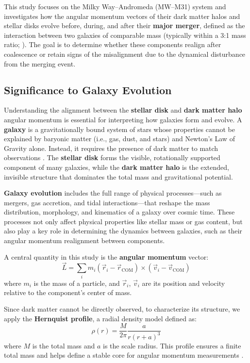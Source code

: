 \documentclass[twocolumn]{aastex631}
\begin{document}
This study focuses on the Milky Way–Andromeda (MW–M31) system and investigates how the angular momentum vectors of their dark matter halos and stellar disks evolve before, during, and after their \textbf{major merger}, defined as the interaction between two galaxies of comparable mass (typically within a 3:1 mass ratio; \citealt{Lotz2011}). The goal is to determine whether these components realign after coalescence or retain signs of the misalignment due to the dynamical disturbance from the merging event.


\subsection{Significance to Galaxy Evolution}

Understanding the alignment between the \textbf{stellar disk} and \textbf{dark matter halo} angular momentum is essential for interpreting how galaxies form and evolve. A \textbf{galaxy} is a gravitationally bound system of stars whose properties cannot be explained by baryonic matter (i.e., gas, dust, and stars) and Newton's Law of Gravity alone. Instead, it requires the presence of dark matter to match observations \citep{Willman2012}. The \textbf{stellar disk} forms the visible, rotationally supported component of many galaxies, while the \textbf{dark matter halo} is the extended, invisible structure that dominates the total mass and gravitational potential.

\textbf{Galaxy evolution} includes the full range of physical processes—such as mergers, gas accretion, and tidal interactions—that reshape the mass distribution, morphology, and kinematics of a galaxy over cosmic time. These processes not only affect physical properties like stellar mass or gas content, but also play a key role in determining the dynamics between galaxies, such as their angular momentum realignment between components.

A central quantity in this study is the \textbf{angular momentum} vector:
\[
\vec{L} = \sum_i m_i (\vec{r}_i - \vec{r}_{\text{COM}}) \times (\vec{v}_i - \vec{v}_{\text{COM}})
\]
where $m_i$ is the mass of a particle, and $\vec{r}_i$, $\vec{v}_i$ are its position and velocity relative to the component’s center of mass.

Since dark matter cannot be directly observed, to characterize its structure, we apply the \textbf{Hernquist profile}, a radial density model defined as:
\[
\rho(r) = \frac{M}{2\pi} \frac{a}{r(r+a)^3}
\]
where $M$ is the total mass and $a$ is the scale radius. This profile ensures a finite total mass and helps define a stable core for angular momentum measurements \citep{Hernquist1990}.
\end{document}
